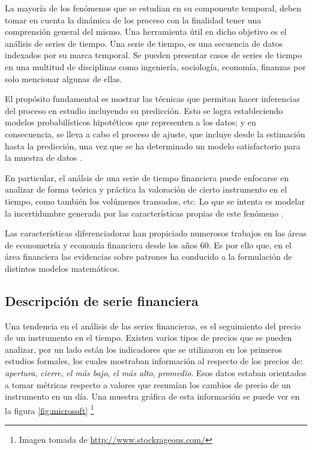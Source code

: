 La mayoría de los fenómenos que se estudian en su componente temporal, deben
tomar en cuenta la dinámica de los proceso con la finalidad tener una
comprensión general del mismo. Una herramienta útil en dicho objetivo es el
análisis de series de tiempo. Una serie de tiempo, es una secuencia de datos
indexados por su marca temporal. Se pueden presentar casos de series de tiempo
en una multitud de disciplinas como ingeniería, sociología, economía, finanzas
por solo mencionar algunas de ellas.

El propósito fundamental es mostrar las técnicas que permitan hacer inferencias
del proceso en estudio incluyendo su predicción. Esto se logra estableciendo
modelos probabilísticos hipotéticos que representen a los datos; y en
consecuencia, se lleva a cabo el proceso de ajuste, que incluye desde la
estimación hasta la predicción, una vez que se ha determinado un modelo
satisfactorio para la muestra de datos \cite{box2011time}
\cite{vandaele1983applied}. 

En particular, el análsis de una serie de tiempo financiera puede enfocarse en
analizar de forma teórica y práctica la valoración de cierto instrumento en el
tiempo, como también los volúmenes transados, etc. Lo que se intenta es modelar
la incertidumbre generada por las características propias de este fenómeno
\cite{tsay2005analysis}. 

Las características diferenciadoras han propiciado numerosos trabajos en las
áreas de econometría y economía financiera desde los años 60. Es por ello que,
en el área financiera las evidencias sobre patrones ha conducido a la
formulación de distintos modelos matemáticos.

\subsection{Descripción de serie financiera}

Una tendencia en el análisis de las series financieras, es el seguimiento del
precio de un instrumento en el tiempo.
Existen varios tipos de precios que se pueden analizar, por un lado están los
indicadores que se utilizaron en los primeros estudios formales, los cuales
mostraban información al respecto de los precios de: \emph{apertura},
\emph{cierre}, \emph{el más bajo}, \emph{el más alto}, \emph{promedio}. Esos
datos estaban orientados a tomar métricas respecto a valores que resumían los
cambios de precio de un instrumento en un día. Una muestra gráfica de esta
información se puede ver en la figura \ref{fig:microsoft} \footnote{Imagen
tomada de \url{http://www.stockrageous.com/}}

